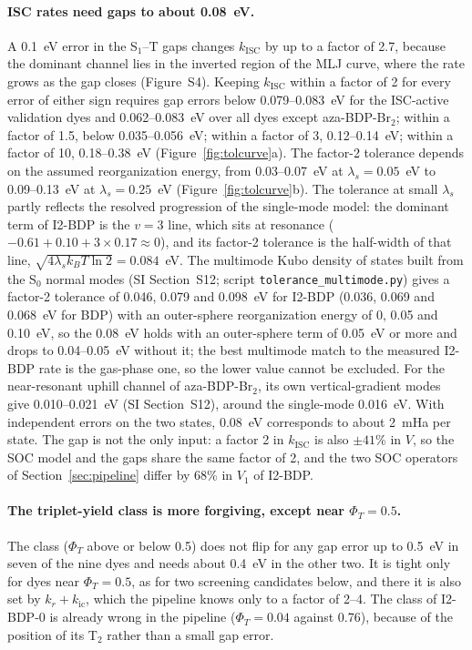 \documentclass[journal=jctcce,manuscript=article]{achemso}
\newcommand{\kisc}{k_\mathrm{ISC}}
\begin{document}
\paragraph{ISC rates need gaps to about 0.08~eV.} A 0.1~eV error in the S$_1$--T gaps changes $\kisc$ by
up to a factor of 2.7, because the dominant channel lies in the inverted region of the MLJ curve, where the
rate grows as the gap closes (Figure~S4). Keeping $\kisc$ within a factor of 2 for every error
of either sign requires gap errors below 0.079--0.083~eV for the ISC-active validation dyes and
0.062--0.083~eV over all dyes except aza-BDP-Br$_2$; within a factor of 1.5, below 0.035--0.056~eV; within a factor of 3,
0.12--0.14~eV; within a factor of 10, 0.18--0.38~eV (Figure~\ref{fig:tolcurve}a). The factor-2 tolerance
depends on the assumed reorganization energy, from 0.03--0.07~eV at $\lambda_s=0.05$~eV to
0.09--0.13~eV at $\lambda_s=0.25$~eV (Figure~\ref{fig:tolcurve}b). The tolerance at small $\lambda_s$ partly reflects the resolved
progression of the single-mode model: the dominant term of I2-BDP is the $v=3$ line, which sits at resonance
($-0.61+0.10+3\times0.17\approx0$), and its factor-2 tolerance is the half-width of that line,
$\sqrt{4\lambda_sk_BT\ln2}=0.084$~eV. The multimode Kubo density of states built from the S$_0$ normal modes (SI Section~S12; script
\texttt{tolerance\_multimode.py}) gives a factor-2 tolerance of 0.046, 0.079 and 0.098~eV for I2-BDP (0.036, 0.069 and
0.068~eV for BDP) with an outer-sphere reorganization energy of 0, 0.05 and 0.10~eV, so the 0.08~eV holds
with an outer-sphere term of 0.05~eV or more and drops to 0.04--0.05~eV without it; the best multimode match to the
measured I2-BDP rate is the gas-phase one, so the lower value cannot be excluded. For the near-resonant uphill
channel of aza-BDP-Br$_2$, its own vertical-gradient modes give 0.010--0.021~eV (SI Section~S12), around the
single-mode 0.016~eV. With independent errors on the two states, 0.08~eV corresponds to
about 2~mHa per state. The gap is not the only input: a factor 2 in $\kisc$ is also $\pm41$\% in $V$, so the
SOC model and the gaps share the same factor of 2, and the two SOC operators of Section~\ref{sec:pipeline} differ by 68\% in
$V_1$ of I2-BDP.

\paragraph{The triplet-yield class is more forgiving, except near $\Phi_T=0.5$.} The
class ($\Phi_T$ above or below 0.5) does not flip for any gap error up to 0.5~eV in seven of the nine
dyes and needs about 0.4~eV in the other two. It is tight only for dyes near $\Phi_T=0.5$, as for two
screening candidates below, and there it is also set by $k_r+k_\mathrm{ic}$, which the pipeline knows only
to a factor of 2--4. The class of I2-BDP-0 is already wrong in the pipeline ($\Phi_T=0.04$ against 0.76), because
of the position of its T$_2$ rather than a small gap error.
\end{document}
